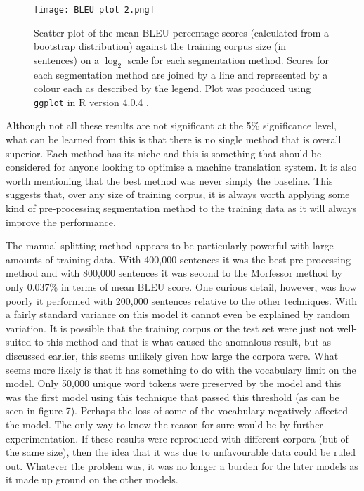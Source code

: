 \documentclass[11pt]{article}
\begin{document}
\bigskip

\begin{figure}[h]
    \centering
    \texttt{[image: BLEU plot 2.png]}
    \caption{Scatter plot of the mean BLEU percentage scores (calculated from a bootstrap distribution) against the training corpus size (in sentences) on a $\log_2$ scale for each segmentation method. Scores for each segmentation method are joined by a line and represented by a colour each as described by the legend. Plot was produced using \texttt{ggplot} \citep{ggplot} in R version 4.0.4 \citep{R}.}
    \label{fig:bleu}
\end{figure}

Although not all these results are not significant at the 5\% significance level, what can be learned from this is that there is no single method that is overall superior. Each method has its niche and this is something that should be considered for anyone looking to optimise a machine translation system. It is also worth mentioning that the best method was never simply the baseline. This suggests that, over any size of training corpus, it is always worth applying some kind of pre-processing segmentation method to the training data as it will always improve the performance.

\bigskip

The manual splitting method appears to be particularly powerful with large amounts of training data. With 400,000 sentences it was the best pre-processing method and with 800,000 sentences it was second to the Morfessor method by only 0.037\% in terms of mean BLEU score. One curious detail, however, was how poorly it performed with 200,000 sentences relative to the other techniques. With a fairly standard variance on this model it cannot even be explained by random variation. It is possible that the training corpus or the test set were just not well-suited to this method and that is what caused the anomalous result, but as discussed earlier, this seems unlikely given how large the corpora were. What seems more likely is that it has something to do with the vocabulary limit on the model. Only 50,000 unique word tokens were preserved by the model and this was the first model using this technique that passed this threshold (as can be seen in figure 7). Perhaps the loss of some of the vocabulary negatively affected the model. The only way to know the reason for sure would be by further experimentation. If these results were reproduced with different corpora (but of the same size), then the idea that it was due to unfavourable data could be ruled out. Whatever the problem was, it was no longer a burden for the later models as it made up ground on the other models.
\end{document}

